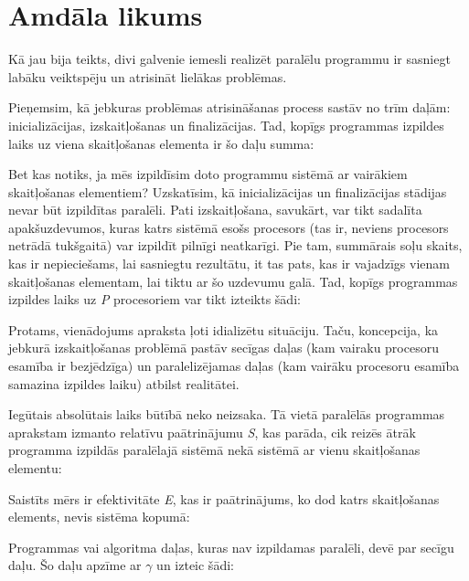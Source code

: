 
\section{Amdāla likums}
Kā jau bija teikts, divi galvenie iemesli realizēt paralēlu programmu ir
sasniegt labāku veiktspēju un atrisināt lielākas problēmas.

Pieņemsim, kā jebkuras problēmas atrisināšanas process sastāv no trīm daļām:
inicializācijas, izskaitļošanas un finalizācijas. Tad, kopīgs programmas izpildes
laiks uz viena skaitļošanas elementa ir šo daļu summa:

Bet kas notiks, ja mēs izpildīsim doto programmu sistēmā ar vairākiem skaitļošanas
elementiem? Uzskatīsim, kā inicializācijas un finalizācijas stādijas nevar būt
izpildītas paralēli. Pati izskaitļošana, savukārt, var tikt sadalīta apakšuzdevumos, kuras
katrs sistēmā esošs procesors (tas ir, neviens procesors netrādā tukšgaitā) var
izpildīt pilnīgi neatkarīgi. Pie tam, summārais soļu skaits, kas ir nepieciešams,
lai sasniegtu rezultātu, it tas pats, kas ir vajadzīgs vienam skaitļošanas
elementam, lai tiktu ar šo uzdevumu galā. Tad, kopīgs programmas izpildes laiks
uz \emph{P} procesoriem var tikt izteikts šādi:

Protams, vienādojums  apraksta ļoti idializētu situāciju.
Taču, koncepcija, ka jebkurā izskaitļošanas problēmā pastāv secīgas daļas
(kam vairaku procesoru esamība ir bezjēdzīga) un paralelizējamas daļas (kam
vairāku procesoru esamība samazina izpildes laiku) atbilst realitātei.

Iegūtais absolūtais laiks būtībā neko neizsaka. Tā vietā paralēlās programmas
aprakstam izmanto relatīvu paātrinājumu \emph{S}, kas parāda, cik reizēs ātrāk
programma izpildās paralēlajā sistēmā nekā sistēmā ar vienu skaitļošanas elementu:

Saistīts mērs ir efektivitāte \emph{E}, kas ir paātrinājums, ko dod katrs skaitļošanas
elements, nevis sistēma kopumā:

Programmas vai algoritma daļas, kuras nav izpildamas paralēli, devē par secīgu
daļu. Šo daļu apzīme ar $\gamma$ un izteic šādi:

